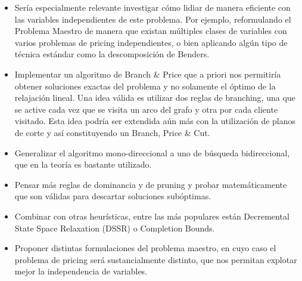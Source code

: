 \begin{itemize}
    \item Sería especialmente relevante investigar cómo lidiar de manera eficiente con las variables independientes de este problema. Por ejemplo, reformulando el Problema Maestro de manera que existan múltiples clases de variables con varios problemas de pricing independientes, o bien aplicando algún tipo de técnica estándar como la descomposición de Benders.  

    \item Implementar un algoritmo de Branch \& Price que a priori nos permitiría obtener soluciones exactas del problema y no solamente el óptimo de la relajación lineal. Una idea válida es utilizar dos reglas de branching, una que se active cada vez que se visita un arco del grafo y otra por cada cliente visitado. Esta idea podría ser extendida aún más con la utilización de planos de corte y así constituyendo un Branch, Price \& Cut.
    
    \item Generalizar el algoritmo mono-direccional a uno de búsqueda bidireccional, que en la teoría es bastante utilizado.

    \item Pensar más reglas de dominancia y de pruning y probar matemáticamente que son válidas para descartar soluciones subóptimas.
        
    \item Combinar con otras heurísticas, entre las más populares están Decremental State Space Relaxation (DSSR) o Completion Bounds. 

    \item Proponer distintas formulaciones del problema maestro, en cuyo caso el problema de pricing será sustancialmente distinto, que nos permitan explotar mejor la independencia de variables.
    
\end{itemize}

